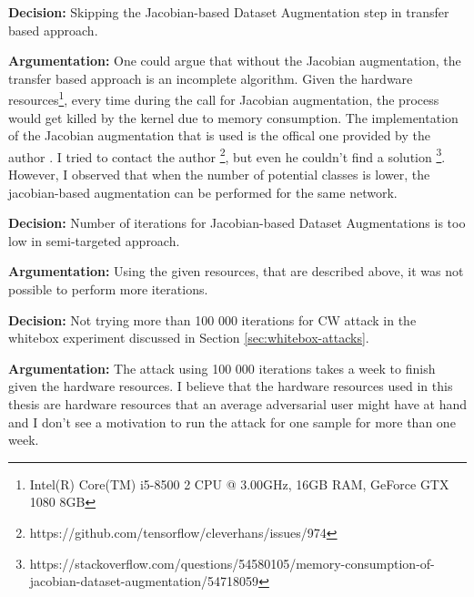 \textbf{Decision:} Skipping the Jacobian-based Dataset Augmentation step in transfer based approach.

\textbf{Argumentation:} One could argue that without the Jacobian augmentation, the transfer based approach is an incomplete algorithm. Given the hardware resources\footnote{Intel(R) Core(TM) i5-8500 2 CPU @ 3.00GHz, 16GB RAM, GeForce GTX 1080 8GB}, every time during the call for Jacobian augmentation, the process would get killed by the kernel due to memory consumption. The implementation of the Jacobian augmentation that is used is the offical one provided by the author \cite{papernot2018cleverhans}. I tried to contact the author \footnote{https://github.com/tensorflow/cleverhans/issues/974}, but even he couldn't find a solution \footnote{https://stackoverflow.com/questions/54580105/memory-consumption-of-jacobian-dataset-augmentation/54718059}. However, I observed that when the number of potential classes is lower, the jacobian-based augmentation can be performed for the same network.

\textbf{Decision:} Number of iterations for Jacobian-based Dataset Augmentations is too low in semi-targeted approach.

\textbf{Argumentation: } Using the given resources, that are described above, it was not possible to perform more iterations.

\textbf{Decision:} 
Not trying more than 100 000 iterations for CW attack in the whitebox experiment discussed in Section \ref{sec:whitebox-attacks}.

\textbf{Argumentation:}
The attack using 100 000 iterations takes a week to finish given the hardware resources. I believe that the hardware resources used in this thesis are hardware resources that an average adversarial user might have at hand and I don't see a motivation to run the attack for one sample for more than one week.